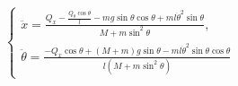 \begin{equation}
    \begin{cases}
        \ddot{x} = \frac{Q_x - \frac{Q_{\theta}\cos\theta}{l} - mg\sin\theta\cos\theta + ml\dot{\theta}^2\sin\theta}{M + m\sin^2\theta}, \\
        \ddot{\theta} = \frac{-Q_x \cos\theta + (M + m)g\sin\theta - ml\dot{\theta}^2\sin\theta\cos\theta}{l(M + m\sin^2\theta)}
    \end{cases}
\end{equation}



